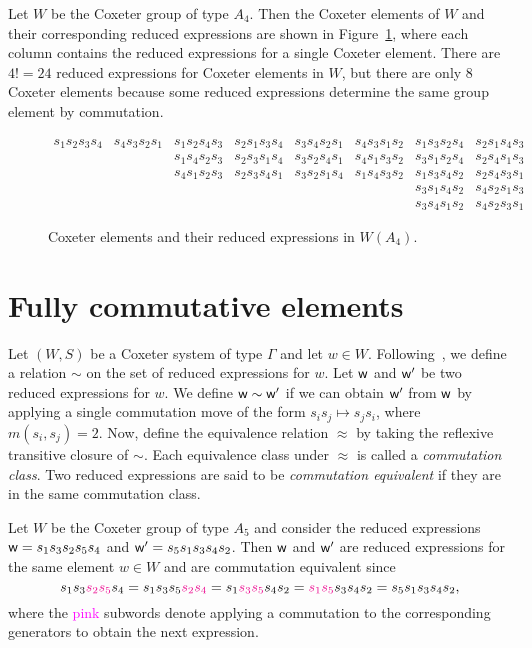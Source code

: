 \begin{example} Let $W$ be the Coxeter group of type $A_4$. Then the Coxeter elements of $W$ and their corresponding reduced expressions are shown in Figure~\ref{fig:coxeltsinA4}, where each column contains the reduced expressions for a single Coxeter element.
    There are $4! = 24$ reduced expressions for Coxeter elements in $W$, but there are only 8 Coxeter elements because some reduced expressions determine the same group element by commutation.
\begin{figure}[h!] \centering
$$\begin{array}{llllllll}
    s_1s_2s_3s_4 & s_4s_3s_2s_1 & s_1s_2s_4s_3 & s_2s_1s_3s_4 & s_3s_4s_2s_1 & s_4s_3s_1s_2 & s_1s_3s_2s_4 & s_2s_1s_4s_3 \\
         &      & s_1s_4s_2s_3 & s_2s_3s_1s_4 & s_3s_2s_4s_1 & s_4s_1s_3s_2 & s_3s_1s_2s_4 & s_2s_4s_1s_3 \\
         &      & s_4s_1s_2s_3 & s_2s_3s_4s_1 & s_3s_2s_1s_4 & s_1s_4s_3s_2 & s_1s_3s_4s_2 & s_2s_4s_3s_1 \\
         &      &      &      &      &      & s_3s_1s_4s_2 & s_4s_2s_1s_3 \\
         &      &      &      &      &      & s_3s_4s_1s_2 & s_4s_2s_3s_1
\end{array}$$
\caption{Coxeter elements and their reduced expressions in $W(A_4)$.} \label{fig:coxeltsinA4}
\end{figure}
\end{example}

\section{Fully commutative elements}\label{sec:FC}
    Let $(W,S)$ be a Coxeter system of type $\Gamma$ and let $w \in W$. Following~\cite{Stembridge1996}, we define a relation $\sim$ on the set of reduced expressions for $w$. Let $\mathsf{w}$ and $\mathsf{w}'$ be two reduced expressions for $w$. 
    We define $\mathsf{w} \sim \mathsf{w}'$ if we can obtain $\mathsf{w}'$ from $\mathsf{w}$ by applying a single commutation move of the form $s_is_j \mapsto s_js_i$, where $m(s_i,s_j) = 2$.
    Now, define the equivalence relation $\approx$ by taking the reflexive transitive closure of $\sim$. Each equivalence class under $\approx$ is called a \emph{commutation class}.
    Two reduced expressions are said to be \emph{commutation equivalent} if they are in the same commutation class.

\begin{example} \label{ex:comm_eq} Let $W$ be the Coxeter group of type $A_5$ and consider the reduced expressions $\mathsf{w} = s_1s_3s_2s_5s_4$ and $\mathsf{w}' = s_5s_1s_3s_4s_2$. Then $\mathsf{w}$ and $\mathsf{w}'$ are reduced expressions for the same element $w \in W$ and are commutation equivalent since
    $$s_1s_3\textcolor{magenta}{s_2s_5}s_4 = s_1s_3s_5\textcolor{magenta}{s_2s_4} = s_1\textcolor{magenta}{s_3s_5}s_4s_2 = \textcolor{magenta}{s_1s_5}s_3s_4s_2 = s_5s_1s_3s_4s_2,$$
    where the \textcolor{magenta}{pink} subwords denote applying a commutation to the corresponding generators to obtain the next expression.
\end{example}

